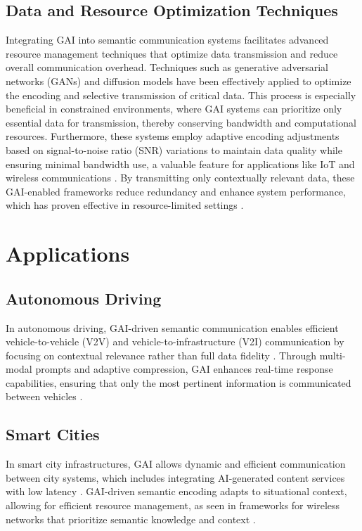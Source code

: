 \documentclass[journal]{IEEEtran}
\begin{document}
\subsection{Data and Resource Optimization Techniques}
Integrating GAI into semantic communication systems facilitates advanced resource management techniques that optimize data transmission and reduce overall communication overhead. Techniques such as generative adversarial networks (GANs) and diffusion models have been effectively applied to optimize the encoding and selective transmission of critical data. This process is especially beneficial in constrained environments, where GAI systems can prioritize only essential data for transmission, thereby conserving bandwidth and computational resources. Furthermore, these systems employ adaptive encoding adjustments based on signal-to-noise ratio (SNR) variations to maintain data quality while ensuring minimal bandwidth use, a valuable feature for applications like IoT and wireless communications \cite{liu2024semanticcommunicationsartificialintelligence}. By transmitting only contextually relevant data, these GAI-enabled frameworks reduce redundancy and enhance system performance, which has proven effective in resource-limited settings \cite{9797984,9953099}.

\section{Applications}

\subsection{Autonomous Driving}
In autonomous driving, GAI-driven semantic communication enables efficient vehicle-to-vehicle (V2V) and vehicle-to-infrastructure (V2I) communication by focusing on contextual relevance rather than full data fidelity \cite{raha2023generativeaidrivensemanticcommunication}. Through multi-modal prompts and adaptive compression, GAI enhances real-time response capabilities, ensuring that only the most pertinent information is communicated between vehicles \cite{10447237}.

\subsection{Smart Cities}
In smart city infrastructures, GAI allows dynamic and efficient communication between city systems, which includes integrating AI-generated content services with low latency \cite{10614204}. GAI-driven semantic encoding adapts to situational context, allowing for efficient resource management, as seen in frameworks for wireless networks that prioritize semantic knowledge and context \cite{bariah2023largegenerativeaimodels}.
\end{document}
